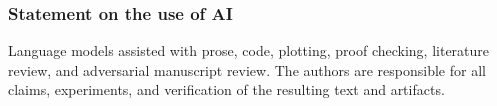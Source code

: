 \documentclass{article}
\theoremstyle{remark}
\begin{document}
\subsubsection*{Statement on the use of AI}
Language models assisted with prose, code, plotting, proof checking, literature review, and
adversarial manuscript review. The authors are responsible for all claims, experiments, and
verification of the resulting text and artifacts.

\clearpage


\clearpage
\appendix






\end{document}
